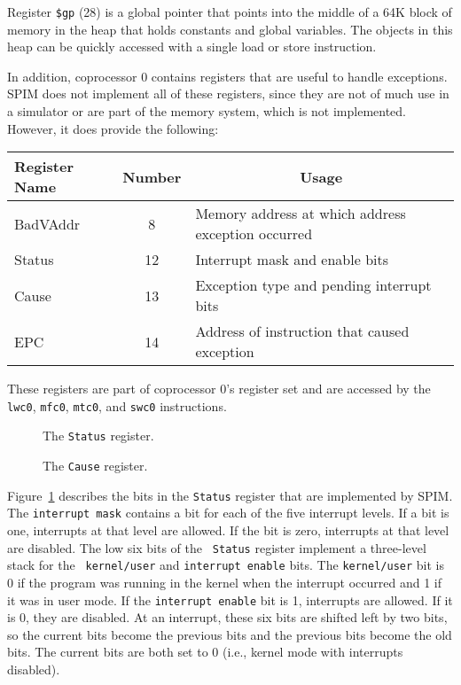 \documentclass[11pt]{article}
\begin{document}
Register {\tt \$gp} (28) is a global pointer that points into the
middle of a 64K block of memory in the heap that holds constants and
global variables.  The objects in this heap can be quickly accessed
with a single load or store instruction.

In addition, coprocessor 0 contains registers that are useful to
handle exceptions.  SPIM does not implement all of these registers,
since they are not of much use in a simulator or are part of the
memory system, which is not implemented.  However, it does provide the
following:
\begin{center}
  \small
  \begin{tabular}{|l|c|l|}
    \hline
    {\bf Register Name} & {\bf Number} & \multicolumn{1}{|c|}{\bf Usage} \\
    \hline
    \hline
    BadVAddr & 8 & Memory address at which address exception occurred \\
    Status & 12 & Interrupt mask and enable bits \\
    Cause & 13 & Exception type and pending interrupt bits \\
    EPC & 14 & Address of instruction that caused exception \\
    \hline
  \end{tabular}
\end{center}
These registers are part of coprocessor 0's register set and are
accessed by the {\tt lwc0}, {\tt mfc0}, {\tt mtc0}, and {\tt swc0}
instructions.

\begin{figure}
  \centerline{}
  \caption{The {\tt Status} register.}
  \label{fig:status_reg}
\end{figure}
\begin{figure}
  \centerline{}
  \caption{The {\tt Cause} register.}
  \label{fig:cause_reg}
\end{figure}
Figure~\ref{fig:status_reg} describes the bits in the {\tt Status}
register that are implemented by SPIM.  The {\tt interrupt mask}
contains a bit for each of the five interrupt levels.  If a bit is
one, interrupts at that level are allowed.  If the bit is zero,
interrupts at that level are disabled.  The low six bits of the {\tt
Status} register implement a three-level stack for the {\tt
kernel/user} and {\tt interrupt enable} bits.  The {\tt kernel/user}
bit is 0 if the program was running in the kernel when the interrupt
occurred and 1 if it was in user mode. If the {\tt interrupt enable}
bit is 1, interrupts are allowed.  If it is 0, they are disabled. At an
interrupt, these six bits are shifted left by two bits, so the current
bits become the previous bits and the previous bits become the old
bits.  The current bits are both set to 0 (i.e., kernel mode with
interrupts disabled).
\end{document}
